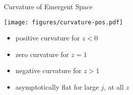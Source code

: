 \documentclass[12pt,aspectratio=169]{beamer}
\begin{document}
\begin{frame}{Curvature of Emergent Space}
\begin{minipage}{0.45\textwidth}
	\texttt{[image: figures/curvature-pos.pdf]}
\end{minipage}
\begin{minipage}{0.5\textwidth}
	\begin{itemize}
		\item positive curvature for \(z < 0\)\\[10pt]
		\item zero curvature for \(z = 1\)\\[10pt]
		\item negative curvature for \(z  > 1\)\\[10pt]
		\item \alert{asymptotically flat} for large \(j\), at all \(z\)
	\end{itemize}
\end{minipage}

\end{frame}
\end{document}
